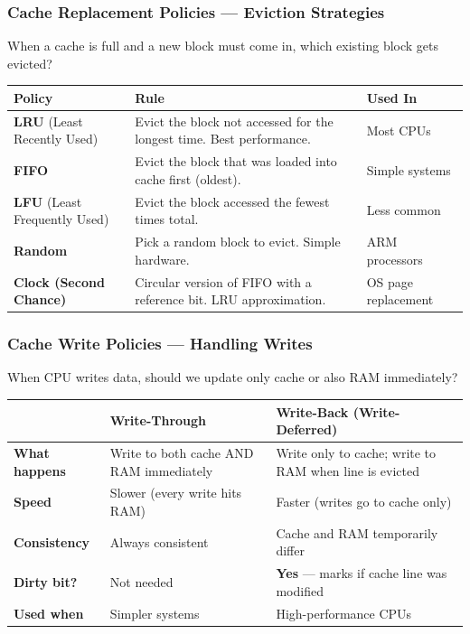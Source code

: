 \documentclass[11pt,a4paper]{article}
\newcommand{\term}[1]{\textbf{\color{darkblue}#1}}
\begin{document}
\subsubsection{Cache Replacement Policies --- Eviction Strategies}

When a cache is full and a new block must come in, which existing block gets evicted?

\begin{center}
\begin{tabular}{L{3.5cm} L{5.5cm} l}
\toprule
\textbf{Policy} & \textbf{Rule} & \textbf{Used In} \\
\midrule
\term{LRU} (Least Recently Used) & Evict the block not accessed for the longest time. Best performance. & Most CPUs \\[4pt]
\term{FIFO} & Evict the block that was loaded into cache first (oldest). & Simple systems \\[4pt]
\term{LFU} (Least Frequently Used) & Evict the block accessed the fewest times total. & Less common \\[4pt]
\term{Random} & Pick a random block to evict. Simple hardware. & ARM processors \\[4pt]
\term{Clock (Second Chance)} & Circular version of FIFO with a reference bit. LRU approximation. & OS page replacement \\
\bottomrule
\end{tabular}
\end{center}

\subsubsection{Cache Write Policies --- Handling Writes}

When CPU writes data, should we update only cache or also RAM immediately?

\begin{center}
\begin{tabular}{L{3cm} L{5.5cm} L{5.5cm}}
\toprule
& \textbf{Write-Through} & \textbf{Write-Back (Write-Deferred)} \\
\midrule
\textbf{What happens} & Write to both cache AND RAM immediately & Write only to cache; write to RAM when line is evicted \\
\textbf{Speed} & Slower (every write hits RAM) & Faster (writes go to cache only) \\
\textbf{Consistency} & Always consistent & Cache and RAM temporarily differ \\
\textbf{Dirty bit?} & Not needed & \textbf{Yes} --- marks if cache line was modified \\
\textbf{Used when} & Simpler systems & High-performance CPUs \\
\bottomrule
\end{tabular}
\end{center}
\end{document}
